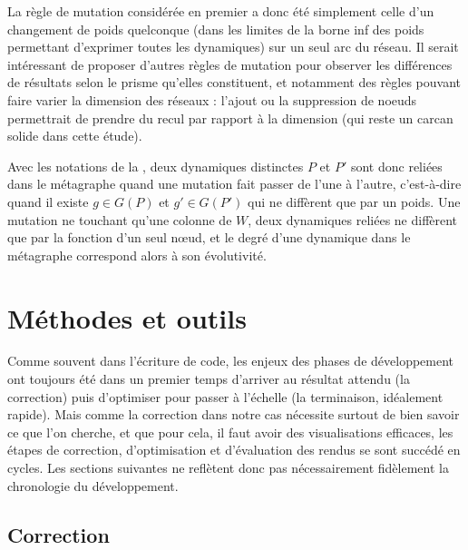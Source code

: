 \documentclass[12pt, a4paper]{article}
\begin{document}
La règle de mutation considérée en premier a donc été simplement celle d'un changement de poids quelconque (dans les limites de la borne inf des poids permettant d'exprimer toutes les dynamiques) sur un seul arc du réseau. Il serait intéressant de proposer d'autres règles de mutation pour observer les différences de résultats selon le prisme qu'elles constituent, et notamment des règles pouvant faire varier la dimension des réseaux : l'ajout ou la suppression de noeuds permettrait de prendre du recul par rapport à la dimension (qui reste un carcan solide dans cette étude). 

Avec les notations de la , deux dynamiques distinctes $P$ et $P'$ sont donc reliées dans le métagraphe quand une mutation fait passer de l'une à l'autre, c'est-à-dire quand il existe $g \in G(P)$ et $g' \in G(P')$ qui ne diffèrent que par un poids.
Une mutation ne touchant qu'une colonne de $W$, deux dynamiques reliées ne diffèrent que par la fonction d'un seul nœud, et le degré d'une dynamique dans le métagraphe correspond alors à son évolutivité.

\section{Méthodes et outils}

Comme souvent dans l'écriture de code, les enjeux des phases de développement ont toujours été dans un premier temps d'arriver au résultat attendu (la correction) puis d'optimiser pour passer à l'échelle (la terminaison, idéalement rapide). Mais comme la correction dans notre cas nécessite surtout de bien savoir ce que l'on cherche, et que pour cela, il faut avoir des visualisations efficaces, les étapes de correction, d'optimisation et d'évaluation des rendus se sont succédé en cycles. Les sections suivantes ne reflètent donc pas nécessairement fidèlement la chronologie du développement.


\subsection{Correction}
\label{sec:correction}
\end{document}
